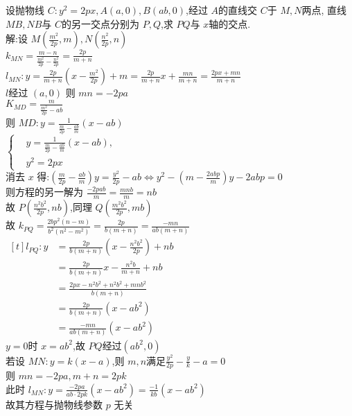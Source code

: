 \documentclass[class=ctexart,crop=false]{standalone}
\begin{document}
设抛物线 $C:y^2=2px,A(a,0),B(ab,0)$,经过 $A$的直线交 $C$于 $M,N$两点,
直线$MB,NB$与 $C$的另一交点分别为 $P,Q$,求 $PQ$与 $x$轴的交点.\\
解:设 $M(\frac{m^2}{2p},m),N(\frac{n^2}{2p},n)$\\
$k_{MN}=\frac{m-n}{\frac{m^2}{2p}-\frac{n^2}{2p}}=\frac{2p}{m+n}$\\
$l_{MN}:y=\frac{2p}{m+n}(x-\frac{m^2}{2p})+m=\frac{2p}{m+n}x+\frac{mn}{m+n}
=\frac{2px+mn}{m+n}$\\
$l$经过 $(a,0)$ 则 $mn=-2pa$\\
$K_{MD}=\frac{m}{\frac{m^2}{2p}-ab}$\\
则 $MD:y=\frac{1}{\frac{m}{2p}-\frac{ab}{m}}(x-ab)$\\
$ \left\{\begin{aligned}
 &y=\frac{1}{\frac{m}{2p}-\frac{ab}{m}}(x-ab) , \\ 
 &y^2=2px 
\end{aligned}\right.$ \\
消去 $x$ 得:$(\frac{m}{2p}-\frac{ab}{m})y=\frac{y^2}{2p}-ab
\Leftrightarrow y^2-(m-\frac{2abp}{m})y-2abp=0$\\
则方程的另一解为 $\frac{-2pab}{m}=\frac{mnb}{m}=nb$\\
故 $P(\frac{n^2b^2}{2p},nb)$,同理 $Q(\frac{m^2b^2}{2p},mb)$\\
故 $k_{PQ}=\frac{2bp^2(n-m)}{b^2(n^2-m^2)}
=\frac{2p}{b(m+n)}=\frac{-mn}{ab(m+n)}$\\
$\begin{aligned}[t]
    l_{PQ}:y&=\frac{2p}{b(m+n)}(x-\frac{n^2b^2}{2p})+nb\\ 
    &=\frac{2p}{b(m+n)}x-\frac{n^2b}{m+n}+nb\\
    &=\frac{2px-n^2b^2+n^2b^2+mnb^2}{b(m+n)}\\
    &=\frac{2p}{b(m+n)}(x-ab^2)\\
    &=\frac{-mn}{ab(m+n)}(x-ab^2)
\end{aligned}$\\
$y=0$时 $x=ab^2$,故 $PQ$经过$(ab^2,0)$\\
若设 $MN:y=k(x-a)$,则 $m,n$满足$\frac{y^2}{2p}-\frac{y}{k}-a=0$\\
则 $mn=-2pa,m+n=2pk$\\
此时 $l_{MN}:y=\frac{-2pa}{ab\cdot 2pk}(x-ab^2)=\frac{-1}{kb}(x-ab^2)$\\
故其方程与抛物线参数 $p$ 无关
\end{document}
